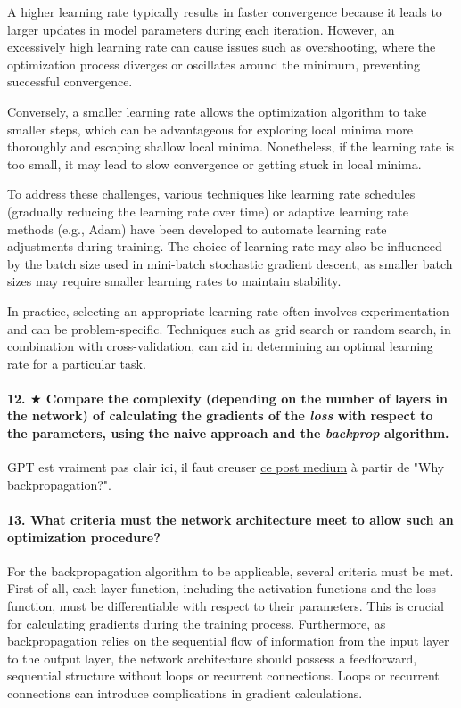 \documentclass{article}
\theoremstyle{plain}%
\theoremstyle{definition}
\theoremstyle{remark}
\begin{document}
A higher learning rate typically results in faster convergence because it leads to larger updates in model parameters during each iteration. However, an excessively high learning rate can cause issues such as overshooting, where the optimization process diverges or oscillates around the minimum, preventing successful convergence.

Conversely, a smaller learning rate allows the optimization algorithm to take smaller steps, which can be advantageous for exploring local minima more thoroughly and escaping shallow local minima. Nonetheless, if the learning rate is too small, it may lead to slow convergence or getting stuck in local minima.

To address these challenges, various techniques like learning rate schedules (gradually reducing the learning rate over time) or adaptive learning rate methods (e.g., Adam) have been developed to automate learning rate adjustments during training. The choice of learning rate may also be influenced by the batch size used in mini-batch stochastic gradient descent, as smaller batch sizes may require smaller learning rates to maintain stability.

In practice, selecting an appropriate learning rate often involves experimentation and can be problem-specific. Techniques such as grid search or random search, in combination with cross-validation, can aid in determining an optimal learning rate for a particular task.

\paragraph{12. $\bigstar$ Compare the complexity (depending on the number of layers in the network) of calculating the gradients of the \textit{loss} with respect to the parameters, using the naive approach and the \textit{backprop} algorithm.}
GPT est vraiment pas clair ici, il faut creuser \href{https://medium.com/spidernitt/breaking-down-neural-networks-an-intuitive-approach-to-backpropagation-3b2ff958794c}{ce post medium} à partir de "Why backpropagation?".

\paragraph{13. What criteria must the network architecture meet to allow such an optimization procedure?}
For the backpropagation algorithm to be applicable, several criteria must be met. First of all, each layer function, including the activation functions and the loss function, must be differentiable with respect to their parameters. This is crucial for calculating gradients during the training process. Furthermore, as backpropagation relies on the sequential flow of information from the input layer to the output layer, the network architecture should possess a feedforward, sequential structure without loops or recurrent connections. Loops or recurrent connections can introduce complications in gradient calculations.
\end{document}
